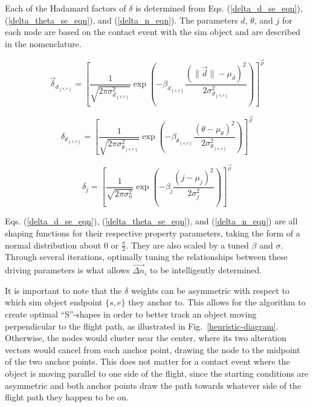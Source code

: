 \documentclass[conf]{new-aiaa}
\begin{document}
Each of the Hadamard factors of $\delta$ is determined from Eqs. (\ref{delta_d_se_eqn}), (\ref{delta_theta_se_eqn}), and (\ref{delta_n_eqn}). The parameters $d$, $\theta$, and $j$ for each node are based on the contact event with the sim object and are described in the nomenclature.

\begin{equation}
\label{delta_d_se_eqn}
\vec{\delta}_{d_{\left\{s,e\right\}}} = \left[\frac{1}{\sqrt{2\pi{\sigma_{d_{\left\{s,e\right\}}}^2}}}\exp\left({-\beta_{d_{\left\{s,e\right\}}}\frac{{\left(\|{\vec{d}}\| - \mu_d\right)}^2}{2\sigma_{d_{\left\{s,e\right\}}}^2}}\right)\right]^{\vec{\rho}}
\end{equation}

\begin{equation}
\label{delta_theta_se_eqn}
\delta_{\theta_{\left\{s,e\right\}}} = \left[\frac{1}{\sqrt{2\pi\sigma_{\theta_{\left\{s,e\right\}}}^2}}\exp\left({-\beta_{\theta_{\left\{s,e\right\}}}\frac{{\left(\theta - \mu_\theta\right)}^2}{2\sigma_{\theta_{\left\{s,e\right\}}}^2}}\right)\right]^{\vec{\rho}}
\end{equation}

\begin{equation}
\label{delta_n_eqn}
\delta_j = \left[\frac{1}{\sqrt{2\pi\sigma_n^2}}\exp\left({-\beta_j\frac{{\left(j - \mu_j\right)}^2}{2\sigma_j^2}}\right)\right]^{\vec{\rho}}
\end{equation}

Eqs. (\ref{delta_d_se_eqn}), (\ref{delta_theta_se_eqn}), and (\ref{delta_n_eqn}) are all shaping functions for their respective property parameters, taking the form of a normal distribution about $0$ or $\frac{\pi}{2}$. They are also scaled by a tuned $\beta$ and $\sigma$. Through several iterations, optimally tuning the relationships between these driving parameters is what allows $\vec{{\Delta}{n}}_i$ to be intelligently determined.

It is important to note that the $\delta$ weights can be asymmetric with respect to which sim object endpoint $\{s,e\}$ they anchor to. This allows for the algorithm to create optimal ``S''-shapes in order to better track an object moving perpendicular to the flight path, as illustrated in Fig.~\ref{heuristic-diagram}. Otherwise, the nodes would cluster near the center, where its two alteration vectors would cancel from each anchor point, drawing the node to the midpoint of the two anchor points. This does not matter for a contact event where the object is moving parallel to one side of the flight, since the starting conditions are asymmetric and both anchor points draw the path towards whatever side of the flight path they happen to be on.
\end{document}
